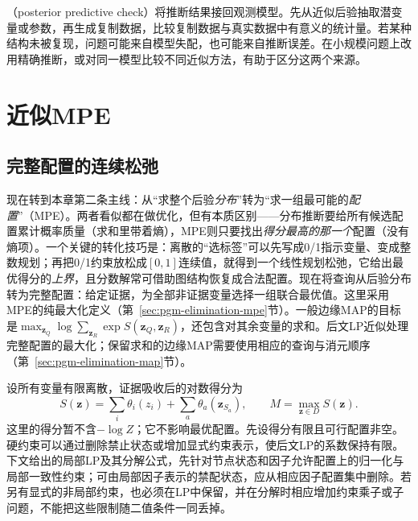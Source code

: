 （posterior predictive check）将推断结果接回观测模型。先从近似后验抽取潜变量或参数，再生成复制数据，比较复制数据与真实数据中有意义的统计量。若某种结构未被复现，问题可能来自模型失配，也可能来自推断误差。在小规模问题上改用精确推断，或对同一模型比较不同近似方法，有助于区分这两个来源。

\section{近似MPE}

\label{sec:pgm-variational-mpe}

\subsection{完整配置的连续松弛}

\label{sec:pgm-variational-ilp-local-polytope}
\label{sec:pgm-variational-lp}

现在转到本章第二条主线：从“求整个后验\emph{分布}”转为“求一组最可能的\emph{配置}”（MPE）。两者看似都在做优化，但有本质区别——分布推断要给所有候选配置累计概率质量（求和里带着熵），MPE则只要找出\emph{得分最高的那一个}配置（没有熵项）。一个关键的转化技巧是：离散的“选标签”可以先写成0/1指示变量、变成整数规划；再把0/1约束放松成$[0,1]$连续值，就得到一个线性规划松弛，它给出最优得分的\emph{上界}，且分数解常可借助图结构恢复成合法配置。现在将查询从后验分布转为完整配置：给定证据，为全部非证据变量选择一组联合最优值。这里采用MPE的纯最大化定义（第~\ref{sec:pgm-elimination-mpe}节）。一般边缘MAP的目标是$\max_{\bm z_Q}\log\sum_{\bm z_R}\exp S(\bm z_Q,\bm z_R)$，还包含对其余变量的求和。后文LP近似处理完整配置的最大化；保留求和的边缘MAP需要使用相应的查询与消元顺序（第~\ref{sec:pgm-elimination-map}节）。

设所有变量有限离散，证据吸收后的对数得分为
\begin{equation}
  S(\bm z)=\sum_i\theta_i(z_i)
              +\sum_a\theta_a(\bm z_{S_a}),
  \qquad M=\max_{\bm z\in D}S(\bm z).
  \label{eq:pgm-variational-mpe-score}
\end{equation}
这里的得分暂不含$-\log Z$；它不影响最优配置。先设得分有限且可行配置非空。硬约束可以通过删除禁止状态或增加显式约束表示，使后文LP的系数保持有限。下文给出的局部LP及其分解公式，先针对节点状态和因子允许配置上的归一化与局部一致性约束；可由局部因子表示的禁配状态，应从相应因子配置集中删除。若另有显式的非局部约束，也必须在LP中保留，并在分解时相应增加约束乘子或子问题，不能把这些限制随二值条件一同丢掉。

